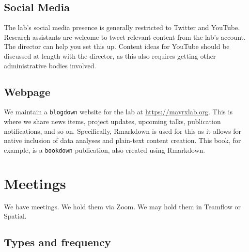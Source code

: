 \documentclass[]{tufte-book}
\begin{document}
\hypertarget{social}{%
\section{Social Media}\label{social}}

The lab's social media presence is generally restricted to Twitter and YouTube. Research assistants are welcome to tweet relevant content from the lab's account. The director can help you set this up. Content ideas for YouTube should be discussed at length with the director, as this also requires getting other administrative bodies involved.

\hypertarget{webpage}{%
\section{Webpage}\label{webpage}}

We maintain a \texttt{blogdown} website for the lab at \url{https://mavrxlab.org}. This is where we share news items, project updates, upcoming talks, publication notifications, and so on. Specifically, Rmarkdown is used for this as it allows for native inclusion of data analyses and plain-text content creation. This book, for example, is a \texttt{bookdown} publication, also created using Rmarkdown.

\hypertarget{meetings}{%
\chapter{Meetings}\label{meetings}}

We have meetings. We hold them via Zoom. We may hold them in Teamflow or Spatial.

\hypertarget{types-and-frequency}{%
\section{Types and frequency}\label{types-and-frequency}}
\end{document}
